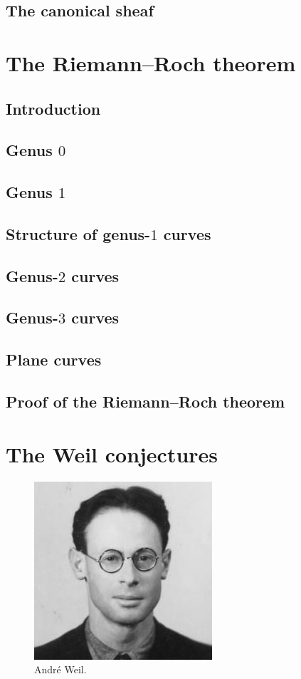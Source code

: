 \documentclass [11 pt, oneside, margin = 1 in] {article}
\begin{document}
\subsection{The canonical sheaf}


\section{The Riemann--Roch theorem}
\subsection{Introduction}
\subsection{Genus $0$}
\subsection{Genus $1$}
\subsection{Structure of genus-$1$ curves}
\subsection{Genus-$2$ curves}
\subsection{Genus-$3$ curves}
\subsection{Plane curves}
\subsection{Proof of the Riemann--Roch theorem}


\section{The Weil conjectures}

\begin{figure}
	\begin{center}
		\includegraphics[scale=0.8]{images/weil}
		\caption{Andr\'e Weil.}
	\end{center}
\end{figure}
\end{document}
